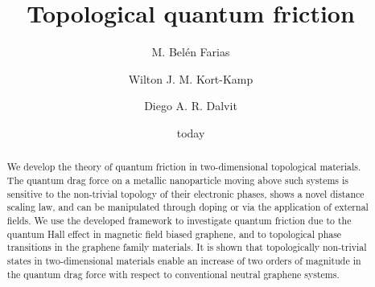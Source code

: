 \documentclass[10pt,aps,prl,superscriptaddress,showpacs,twocolumn]{revtex4-1}
\begin{document}
\title{Topological quantum friction}

\author{M. Bel\' en Farias}

\author{Wilton J. M. Kort-Kamp}

\author{Diego A. R. Dalvit}

\date{today}


\begin{abstract}  
We develop the theory of quantum friction in two-dimensional topological materials. 
The quantum drag force on a metallic nanoparticle moving above such systems is sensitive to the non-trivial topology of their electronic phases, shows a novel distance scaling law, and 
can be manipulated through doping or via the application of external fields. We use the developed framework to investigate quantum friction due to the quantum Hall effect in magnetic field biased graphene, and to topological phase transitions in the graphene family materials. It is shown that topologically non-trivial states in two-dimensional materials enable an increase of two orders of magnitude in the quantum drag force with respect to conventional neutral graphene systems.
\end{abstract}
\maketitle
\end{document}
